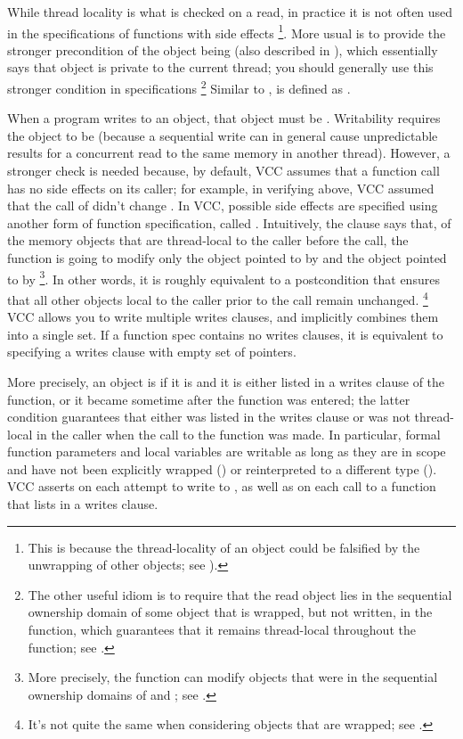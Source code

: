 While thread locality is what is checked on a read, in practice it is
not often used in the specifications of functions with side effects%
\footnote{This is because the thread-locality of an object could be
  falsified by the unwrapping of other objects; see
  ).}.  More usual is to provide the stronger
precondition of the object being \vcc{\mutable} (also described in
), which essentially says that object is
private to the current thread; you should generally use this stronger
condition in specifications%
\footnote{The other useful idiom is to require that the read object
  lies in the sequential ownership domain of some object that is
  wrapped, but not written, in the function, which guarantees that it
  remains thread-local throughout the function; see
  .} Similar to ,
 is defined as
.


When a program writes to an object, that object must be
. Writability requires the object to be \vcc{\mutable}
(because a sequential write can in general cause unpredictable results
for a concurrent read to the same memory in another thread). 
However, a stronger check is needed because, by default, VCC assumes that a
function call has no side effects on its caller; for example, in
verifying  above, VCC assumed that the call of
 didn't change . 
In VCC, possible side effects are specified using 
another form of function specification, called .
Intuitively, the clause  says that, 
of the memory objects that are thread-local to the caller before the call,
the function is going to modify only the object pointed to by 
and the object pointed to by %
\footnote{More precisely, the function can modify objects that were in
  the sequential ownership domains of  and ; see 
  .}.
In other words, it is roughly equivalent to a postcondition that ensures
that all other objects local to the caller prior
to the call remain unchanged.%
\footnote{It's not quite the same when considering objects that are
  wrapped; see .}  VCC allows you
to write multiple writes clauses, and implicitly
combines them into a single set. If a function spec contains no writes clauses, 
it is equivalent to specifying a writes clause with empty set of
pointers.

More precisely, an object is \vcc{\writable} if it is \vcc{\mutable} and 
it is either listed in a writes clause of the function,
or it became \vcc{\mutable} sometime after the function was entered; the 
latter condition guarantees that either  was listed in the
writes clause or was not thread-local in the caller when the call to
the function was made. 
In particular, formal function parameters and local variables are
writable as long as they are in scope and have not been explicitly
wrapped () or reinterpreted to a
different type ().  VCC asserts
 on each attempt to write to , as well as on
each call to a function that lists  in a writes clause.

